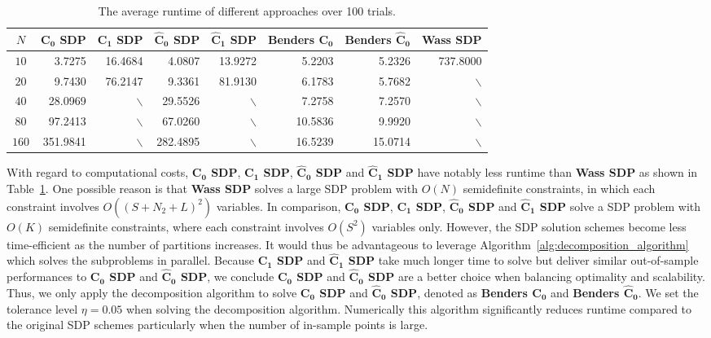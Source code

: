 \documentclass{article}
\begin{document}
\begin{table}[t!]
\color{black}
\centering
\begin{tabular}{|c|rrrrrrr|}\hline
$N$   & \textbf{$\mathbf{C_0}$ SDP} & \textbf{$\mathbf{C_1}$ SDP}  & \textbf{$\mathbf{\hat{C}_0}$ SDP} & \textbf{$\mathbf{\hat{C}_1}$ SDP}  & \textbf{Benders $\mathbf{C_0}$} & \textbf{Benders $\mathbf{\hat{C}_0}$} &  \textbf{Wass SDP} \\
[0.0mm] \hline
$10$  & 3.7275 & 16.4684 & 4.0807 & 13.9272 & 5.2203 & 5.2326 & 737.8000 \\
$20$  & 9.7430 & 76.2147 & 9.3361 & 81.9130 & 6.1783 & 5.7682 & $\backslash$ \\
$40$ & 28.0969 & $\backslash$ & 29.5526 & $\backslash$ & 7.2758 & 7.2570 & $\backslash$ \\ 
$80$ & 97.2413 & $\backslash$ & 67.0260 & $\backslash$  & 10.5836 & 9.9920 & $\backslash$ \\
$160$ & 351.9841 & $\backslash$ & 282.4895 & $\backslash$ & 16.5239 & 15.0714 & $\backslash$ \\
\hline\hline
\end{tabular}
\caption[]{The average runtime of different approaches over 100 trials.
}
\label{tbl:inventory3}
\end{table}

With regard to computational costs,  \textbf{$\mathbf{C_0}$ SDP}, \textbf{$\mathbf{C_1}$ SDP}, \textbf{$\mathbf{\hat{C}_0}$ SDP} and \textbf{$\mathbf{\hat{C}_1}$ SDP} have notably less runtime than \textbf{Wass SDP} as shown in Table~\ref{tbl:inventory3}. One possible reason is that \textbf{Wass SDP}  solves a large SDP problem with $O(N)$ semidefinite constraints, in which each constraint involves $O((S+N_2+L)^2)$ variables. In comparison, \textbf{$\mathbf{C_0}$ SDP}, \textbf{$\mathbf{C_1}$ SDP}, \textbf{$\mathbf{\hat{C}_0}$ SDP} and \textbf{$\mathbf{\hat{C}_1}$ SDP} solve a SDP problem with $O(K)$ semidefinite constraints, where each constraint involves $O(S^2)$ variables only. However, the SDP solution schemes become less time-efficient as the number of partitions increases. It would thus be advantageous to leverage Algorithm~\ref{alg:decomposition_algorithm} which solves the subproblems in parallel. Because \textbf{$\mathbf{C_1}$ SDP} and \textbf{$\mathbf{\hat{C}_1}$ SDP} take much longer time to solve but deliver similar out-of-sample performances to \textbf{$\mathbf{C_0}$ SDP} and \textbf{$\mathbf{\hat{C}_0}$ SDP}, we conclude \textbf{$\mathbf{C_0}$ SDP} and \textbf{$\mathbf{\hat{C}_0}$ SDP} are a better choice when balancing optimality and scalability. Thus, we only apply the decomposition algorithm to solve \textbf{$\mathbf{C_0}$ SDP} and \textbf{$\mathbf{\hat{C}_0}$ SDP}, denoted as \textbf{Benders $\mathbf{C_0}$} and \textbf{Benders $\mathbf{\hat{C}_0}$}. We set the tolerance level $\eta = 0.05$ when solving the decomposition algorithm. Numerically this algorithm significantly reduces runtime compared to the original SDP schemes particularly when the number of in-sample points is large.
\end{document}
